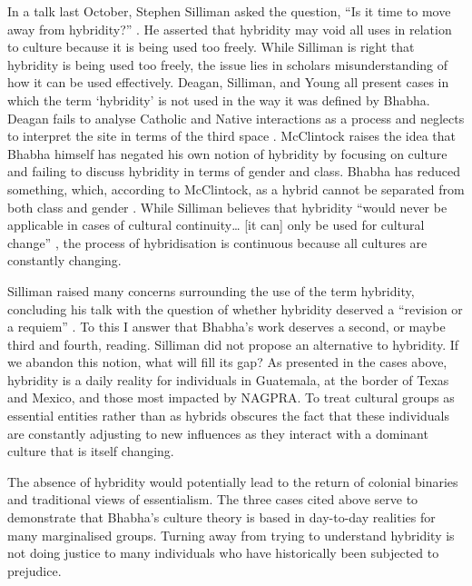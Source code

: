 	In a talk last October, Stephen Silliman asked the question, “Is it time to move away from hybridity?” \parencite {Silliman_2014}. He asserted that hybridity may void all uses in relation to culture because it is being used too freely. While Silliman is right that hybridity is being used too freely, the issue lies in scholars misunderstanding of how it can be used effectively. Deagan, Silliman, and Young all present cases in which the term ‘hybridity’ is not used in the way it was defined by Bhabha. Deagan fails to analyse Catholic and Native interactions as a process and neglects to interpret the site in terms of the third space \parencite [267] {Deagan_2013}. McClintock raises the idea that Bhabha himself has negated his own notion of hybridity by focusing on culture and failing to discuss hybridity in terms of gender and class. Bhabha has reduced something, which, according to McClintock, as a hybrid cannot be separated from both class and gender \parencite [62] {McClintock_1995}. While Silliman believes that hybridity “would never be applicable in cases of cultural continuity… [it can] only be used for cultural change” \parencite [489] {Silliman_2013}, the process of hybridisation is continuous because all cultures are constantly changing. 

	Silliman raised many concerns surrounding the use of the term hybridity, concluding his talk with the question of whether hybridity deserved a “revision or a requiem” \parencite {Silliman_2014}. To this I answer that Bhabha’s work deserves a second, or maybe third and fourth, reading. Silliman did not propose an alternative to hybridity. If we abandon this notion, what will fill its gap? As presented in the cases above, hybridity is a daily reality for individuals in Guatemala, at the border of Texas and Mexico, and those most impacted by NAGPRA. To treat cultural groups as essential entities rather than as hybrids obscures the fact that these individuals are constantly adjusting to new influences as they interact with a dominant culture that is itself changing.

	The absence of hybridity would potentially lead to the return of colonial binaries and traditional views of essentialism. The three cases cited above serve to demonstrate that Bhabha’s culture theory is based in day-to-day realities for many marginalised groups. Turning away from trying to understand hybridity is not doing justice to many individuals who have historically been subjected to prejudice.
	

	
\printbibliography[heading=subbibnumbered] 
\label{Sheridan:lastpage}
\closingarticle

